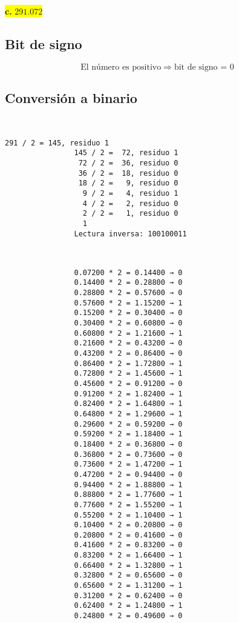 \documentclass[a4paper,12pt]{article}
\begin{document}
		\begin{center}	
		\colorbox{yellow}{{\textbf{c.} $291.072$}}
		
		\subsection*{Bit de signo}
		
		\[
		\text{El número es positivo} \Rightarrow \text{bit de signo = } \boxed{0}
		\]
		
		\subsection*{Conversión a binario}
		~~~~~~~
		\begin{center}
			\begin{Verbatim}[formatcom=\centering]
				291 / 2 = 145, residuo 1
				145 / 2 =  72, residuo 1
				 72 / 2 =  36, residuo 0
				 36 / 2 =  18, residuo 0
				 18 / 2 =   9, residuo 0
				  9 / 2 =   4, residuo 1
				  4 / 2 =   2, residuo 0
				  2 / 2 =   1, residuo 0
				  1               		
				Lectura inversa: 100100011
			\end{Verbatim}
		\end{center}
		
		
		~~~~~~~~~
		
		\begin{center}
			\begin{Verbatim}
				0.07200 * 2 = 0.14400 → 0 
				0.14400 * 2 = 0.28800 → 0 
				0.28800 * 2 = 0.57600 → 0 
				0.57600 * 2 = 1.15200 → 1 
				0.15200 * 2 = 0.30400 → 0 
				0.30400 * 2 = 0.60800 → 0 
				0.60800 * 2 = 1.21600 → 1 
				0.21600 * 2 = 0.43200 → 0 
				0.43200 * 2 = 0.86400 → 0 
				0.86400 * 2 = 1.72800 → 1 
				0.72800 * 2 = 1.45600 → 1 
				0.45600 * 2 = 0.91200 → 0 
				0.91200 * 2 = 1.82400 → 1 
				0.82400 * 2 = 1.64800 → 1 
				0.64800 * 2 = 1.29600 → 1 
				0.29600 * 2 = 0.59200 → 0 
				0.59200 * 2 = 1.18400 → 1 
				0.18400 * 2 = 0.36800 → 0 
				0.36800 * 2 = 0.73600 → 0 
				0.73600 * 2 = 1.47200 → 1 
				0.47200 * 2 = 0.94400 → 0 
				0.94400 * 2 = 1.88800 → 1 
				0.88800 * 2 = 1.77600 → 1 
				0.77600 * 2 = 1.55200 → 1 
				0.55200 * 2 = 1.10400 → 1 
				0.10400 * 2 = 0.20800 → 0 
				0.20800 * 2 = 0.41600 → 0 
				0.41600 * 2 = 0.83200 → 0 
				0.83200 * 2 = 1.66400 → 1 
				0.66400 * 2 = 1.32800 → 1 
				0.32800 * 2 = 0.65600 → 0 
				0.65600 * 2 = 1.31200 → 1 
				0.31200 * 2 = 0.62400 → 0 
				0.62400 * 2 = 1.24800 → 1 
				0.24800 * 2 = 0.49600 → 0  	
			\end{Verbatim}
		\end{center}
		

\end{center}
\end{document}
